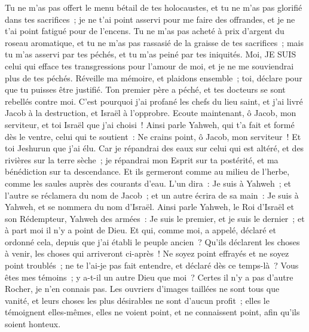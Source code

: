 \begin{multicols}{2}
Tu ne m'as pas offert le menu bétail de tes holocaustes, et tu ne m'as pas glorifié dans tes sacrifices~; je ne t'ai point asservi pour me faire des offrandes, et je ne t'ai point fatigué pour de l'encens.
Tu ne m'as pas acheté à prix d'argent du roseau aromatique, et tu ne m'as pas rassasié de la graisse de tes sacrifices~; mais tu m'as asservi par tes péchés, et tu m'as peiné par tes iniquités.
Moi, JE SUIS celui qui efface tes transgressions pour l'amour de moi, et je ne me souviendrai plus de tes péchés.
Réveille ma mémoire, et plaidons ensemble~; toi, déclare pour que tu puisses être justifié.
Ton premier père a péché, et tes docteurs se sont rebellés contre moi.
C'est pourquoi j'ai profané les chefs du lieu saint, et j'ai livré Jacob à la destruction, et Israël à l'opprobre.
\VerseOne{}Ecoute maintenant, ô Jacob, mon serviteur, et toi Israël que j'ai choisi~!
Ainsi parle Yahweh, qui t'a fait et formé dès le ventre, celui qui te soutient~: Ne crains point, ô Jacob, mon serviteur~! Et toi Jeshurun que j'ai élu.
Car je répandrai des eaux sur celui qui est altéré, et des rivières sur la terre sèche~; je répandrai mon Esprit sur ta postérité, et ma bénédiction sur ta descendance.
Et ils germeront comme au milieu de l'herbe, comme les saules auprès des courants d'eau.
L'un dira~: Je suis à Yahweh~; et l'autre se réclamera du nom de Jacob~; et un autre écrira de sa main~: Je suis à Yahweh, et se nommera du nom d'Israël.
Ainsi parle Yahweh, le Roi d'Israël et son Rédempteur, Yahweh des armées~: Je suis le premier, et je suis le dernier~; et à part moi il n'y a point de Dieu.
Et qui, comme moi, a appelé, déclaré et ordonné cela, depuis que j'ai établi le peuple ancien~? Qu'ils déclarent les choses à venir, les choses qui arriveront ci-après~!
Ne soyez point effrayés et ne soyez point troublés~; ne te l'ai-je pas fait entendre, et déclaré dès ce temps-là~? Vous êtes mes témoins~; y a-t-il un autre Dieu que moi~? Certes il n'y a pas d'autre Rocher, je n'en connais pas.
Les ouvriers d'images taillées ne sont tous que vanité, et leurs choses les plus désirables ne sont d'aucun profit~; elles le témoignent elles-mêmes, elles ne voient point, et ne connaissent point, afin qu'ils soient honteux.

\end{multicols}
